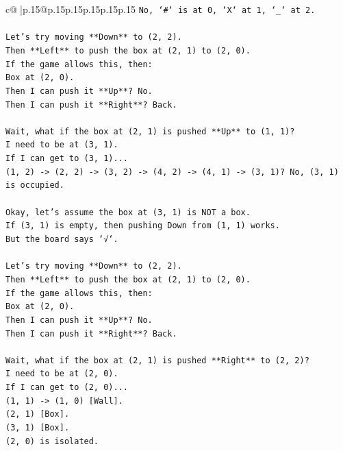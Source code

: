 \documentclass{article}
\begin{document}
{\begin{supertabular}{c@{$\;$}|p{.15\linewidth}@{}p{.15\linewidth}p{.15\linewidth}p{.15\linewidth}p{.15\linewidth}p{.15\linewidth}}
{{{\texttt{No, `\#` is at 0, `X` at 1, `\_` at 2.} \\
\\ 
\texttt{Let's try moving **Down** to (2, 2).} \\
\texttt{Then **Left** to push the box at (2, 1) to (2, 0).} \\
\texttt{If the game allows this, then:} \\
\texttt{Box at (2, 0).} \\
\texttt{Then I can push it **Up**? No.} \\
\texttt{Then I can push it **Right**? Back.} \\
\\ 
\texttt{Wait, what if the box at (2, 1) is pushed **Up** to (1, 1)?} \\
\texttt{I need to be at (3, 1).} \\
\texttt{If I can get to (3, 1)...} \\
\texttt{(1, 2) {-}> (2, 2) {-}> (3, 2) {-}> (4, 2) {-}> (4, 1) {-}> (3, 1)? No, (3, 1) is occupied.} \\
\\ 
\texttt{Okay, let's assume the box at (3, 1) is NOT a box.} \\
\texttt{If (3, 1) is empty, then pushing Down from (1, 1) works.} \\
\texttt{But the board says `√`.} \\
\\ 
\texttt{Let's try moving **Down** to (2, 2).} \\
\texttt{Then **Left** to push the box at (2, 1) to (2, 0).} \\
\texttt{If the game allows this, then:} \\
\texttt{Box at (2, 0).} \\
\texttt{Then I can push it **Up**? No.} \\
\texttt{Then I can push it **Right**? Back.} \\
\\ 
\texttt{Wait, what if the box at (2, 1) is pushed **Right** to (2, 2)?} \\
\texttt{I need to be at (2, 0).} \\
\texttt{If I can get to (2, 0)...} \\
\texttt{(1, 1) {-}> (1, 0) {[}Wall{]}.} \\
\texttt{(2, 1) {[}Box{]}.} \\
\texttt{(3, 1) {[}Box{]}.} \\
\texttt{(2, 0) is isolated.} \\
\\ 
}}}
\end{supertabular}}
\end{document}
